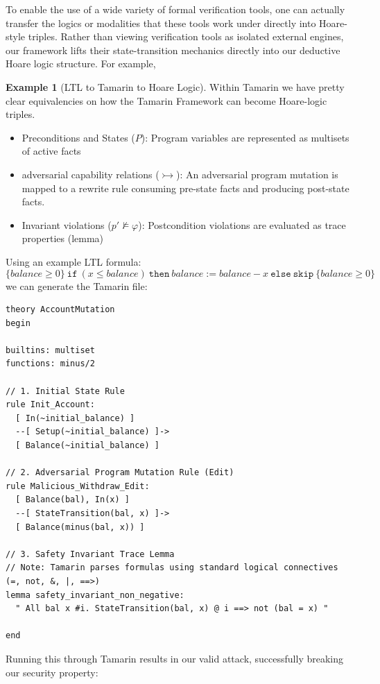 \documentclass[11pt]{amsart}
\theoremstyle{definition}
\newtheorem{example}{Example}
\theoremstyle{remark}
\newcommand{\nsat}{\not\models}
\newcommand{\adv}{\rightarrowtail}   %
\begin{document}
To enable the use of a wide variety of formal verification tools, one can actually transfer the logics or
modalities that these tools work under directly into Hoare-style triples. Rather than viewing verification
tools as isolated external engines, our framework lifts their state-transition mechanics directly into our
deductive Hoare logic structure. For example,

\begin{example}[LTL to Tamarin to Hoare Logic]
\label{ex:tamarin}
Within Tamarin we have pretty clear equivalencies on how the Tamarin Framework can become
Hoare-logic triples.
\begin{itemize}
  \item Preconditions and States ($P$): Program variables are represented as multisets of active facts
  \item adversarial capability relations ($\adv$): An adversarial program mutation is mapped to a rewrite rule
  consuming pre-state facts and producing post-state facts.
  \item Invariant violations ($p' \nsat \varphi$): Postcondition violations are evaluated as trace properties (lemma)
\end{itemize}

Using an example LTL formula:
\[
  \{\mathit{balance} \geq 0\}\ \mathtt{if}\ (x \leq \mathit{balance})\ \mathtt{then}\ \mathit{balance} := \mathit{balance} - x\ \mathtt{else}\ \mathtt{skip}\ \{\mathit{balance} \geq 0\}
\]
we can generate the Tamarin file:

\begin{lstlisting}[style=tamarin]
theory AccountMutation
begin

builtins: multiset
functions: minus/2

// 1. Initial State Rule
rule Init_Account:
  [ In(~initial_balance) ]
  --[ Setup(~initial_balance) ]->
  [ Balance(~initial_balance) ]

// 2. Adversarial Program Mutation Rule (Edit)
rule Malicious_Withdraw_Edit:
  [ Balance(bal), In(x) ]
  --[ StateTransition(bal, x) ]->
  [ Balance(minus(bal, x)) ]

// 3. Safety Invariant Trace Lemma
// Note: Tamarin parses formulas using standard logical connectives (=, not, &, |, ==>)
lemma safety_invariant_non_negative:
  " All bal x #i. StateTransition(bal, x) @ i ==> not (bal = x) "

end
\end{lstlisting}

Running this through Tamarin results in our valid attack, successfully breaking our security property:


\end{example}
\end{document}
